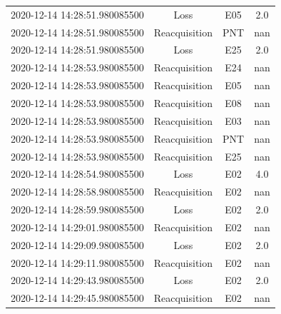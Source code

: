 \begin{enumerate}
\begin{longtabu}{cccc}
2020{-}12{-}14 14:28:51.980085500&Loss&E05&2.0\\%
2020{-}12{-}14 14:28:51.980085500&Reacquisition&PNT&nan\\%
2020{-}12{-}14 14:28:51.980085500&Loss&E25&2.0\\%
2020{-}12{-}14 14:28:53.980085500&Reacquisition&E24&nan\\%
2020{-}12{-}14 14:28:53.980085500&Reacquisition&E05&nan\\%
2020{-}12{-}14 14:28:53.980085500&Reacquisition&E08&nan\\%
2020{-}12{-}14 14:28:53.980085500&Reacquisition&E03&nan\\%
2020{-}12{-}14 14:28:53.980085500&Reacquisition&PNT&nan\\%
2020{-}12{-}14 14:28:53.980085500&Reacquisition&E25&nan\\%
2020{-}12{-}14 14:28:54.980085500&Loss&E02&4.0\\%
2020{-}12{-}14 14:28:58.980085500&Reacquisition&E02&nan\\%
2020{-}12{-}14 14:28:59.980085500&Loss&E02&2.0\\%
2020{-}12{-}14 14:29:01.980085500&Reacquisition&E02&nan\\%
2020{-}12{-}14 14:29:09.980085500&Loss&E02&2.0\\%
2020{-}12{-}14 14:29:11.980085500&Reacquisition&E02&nan\\%
2020{-}12{-}14 14:29:43.980085500&Loss&E02&2.0\\%
2020{-}12{-}14 14:29:45.980085500&Reacquisition&E02&nan\\%
\hline%
\end{longtabu}%
\end{enumerate}

%
\newpage%
